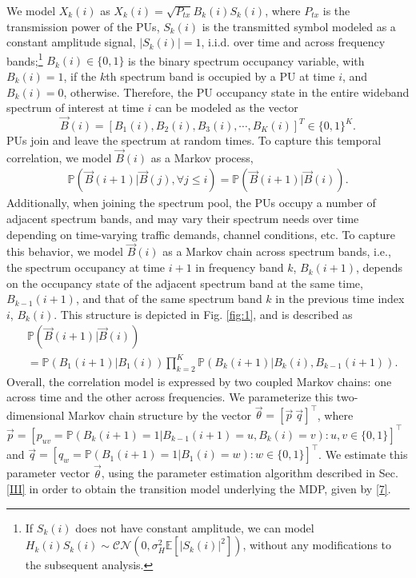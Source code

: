\documentclass[10pt,twocolumn]{IEEEtran}
\begin{document}
We model $X_k(i)$ as $X_k(i){=}\sqrt{P_{tx}}B_k(i)S_k(i)$, where $P_{tx}$ is the transmission power of the PUs, $S_k(i)$ is the transmitted symbol modeled as a constant amplitude signal, $|S_k(i)|{=}1$, i.i.d. over time and across frequency bands;\footnote{If $S_k(i)$ does not have constant amplitude, we can model $H_{k}(i)S_{k}(i){\sim}\mathcal{CN}(0,\sigma_H^2\mathbb{E}[|S_{k}(i)|^2])$, without any modifications to the subsequent analysis.} $B_k(i){\in}\{0,1\}$ is the binary spectrum occupancy variable, with $B_k(i){=}1$, if the $k$th spectrum band is occupied by a PU at time $i$, and $B_k(i){=}0$, otherwise. Therefore, the PU occupancy state in the entire wideband spectrum of interest at time $i$ can be modeled as the vector 
\begin{equation}\label{5}
    \vec{B}(i) = [B_1(i), B_2(i), B_3(i), \cdots, B_K(i)]^T {\in} \{0, 1\}^K.
\end{equation}
PUs join and leave the spectrum at random times. To capture this temporal correlation, we model $\vec{B}(i)$ as a Markov process,
\begin{equation}\label{6}
    \begin{aligned}
        \mathbb{P}(\vec{B}(i+1)|\vec{B}(j), \forall j \leq i) = \mathbb{P}(\vec{B}(i+1)|\vec{B}(i)).
    \end{aligned}
\end{equation}
Additionally, when joining the spectrum pool, the PUs occupy a number of adjacent spectrum bands, and may vary their spectrum needs over time depending on time-varying traffic demands, channel conditions, etc. To capture this behavior, we model $\vec{B}(i)$ as a Markov chain across spectrum bands, i.e., the spectrum occupancy at time $i{+}1$ in frequency band $k$, $B_{k}(i{+}1)$, depends on the occupancy state of the adjacent spectrum band at the same time, $B_{k{-}1}(i{+}1)$, and that of the same spectrum band $k$ in the previous time index $i$, $B_{k}(i)$. This structure is depicted in Fig. \ref{fig:1}, and is described as
\begin{align}\label{7}
&         \mathbb{P}(\vec{B}(i+1)|\vec{B}(i))\\&=
\nonumber
         \mathbb{P}(B_{1}(i+1)|B_{1}(i))
         \prod_{k=2}^{K} \mathbb{P}(B_{k}(i+1)|B_{k}(i), B_{k-1}(i+1)).
\end{align}
Overall, the correlation model is expressed by two coupled Markov chains: one across time and the other across frequencies. We parameterize this two-dimensional Markov chain structure by the vector $\vec{\theta}{=}[\vec{p}\ \vec{q}]^\intercal$, where $\vec{p}{=}[p_{uv}{=}\mathbb{P}(B_{k}(i{+}1){=}1|B_{k{-}1}(i{+}1){=}u,B_{k}(i){=}v){:} u,v{\in}\{0,1\}]^{\intercal}$ and $\vec{q}=[q_{w}=\mathbb{P}(B_{1}(i+1)=1|B_{1}(i)=w):w \in \{0,1\}]^\intercal$. We estimate this parameter vector $\vec{\theta}$, using the parameter estimation algorithm described in Sec. \ref{III} in order to obtain the transition model underlying the MDP, given by \eqref{7}.
\end{document}
